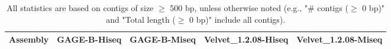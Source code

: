 \documentclass[12pt,a4paper]{article}
\begin{document}
\begin{table}[ht]
\begin{center}
\caption{All statistics are based on contigs of size $\geq$ 500 bp, unless otherwise noted (e.g., "\# contigs ($\geq$ 0 bp)" and "Total length ($\geq$ 0 bp)" include all contigs).}
\begin{tabular}{|l*{4}{|r}|}
\hline
Assembly & GAGE-B-Hiseq & GAGE-B-Miseq & Velvet\_1.2.08-Hiseq & Velvet\_1.2.08-Miseq \\ \hline
\end{tabular}
\end{center}
\end{table}
\end{document}
